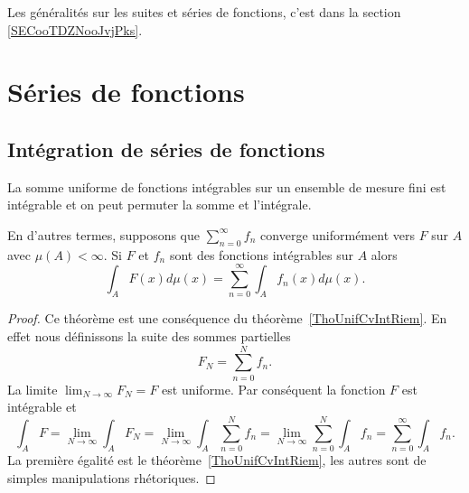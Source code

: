 
Les généralités sur les suites et séries de fonctions, c'est dans la section \ref{SECooTDZNooJvjPks}.

\section{Séries de fonctions}

\subsection{Intégration de séries de fonctions}

\begin{theorem}      \label{ThoCciOlZ}
	La somme uniforme de fonctions intégrables sur un ensemble de mesure fini est intégrable et on peut permuter la somme et l'intégrale.

	En d'autres termes, supposons que \( \sum_{n=0}^{\infty}f_n\) converge uniformément vers \( F\) sur \( A\) avec \( \mu(A)<\infty\). Si \( F\) et \( f_n\) sont des fonctions intégrables sur \( A\) alors
	\begin{equation}
		\int_AF(x)d\mu(x)=\sum_{n=0}^{\infty}\int_Af_n(x)d\mu(x).
	\end{equation}
\end{theorem}

\begin{proof}
	Ce théorème est une conséquence du théorème~\ref{ThoUnifCvIntRiem}. En effet nous définissons la suite des sommes partielles
	\begin{equation}
		F_N=\sum_{n=0}^Nf_n.
	\end{equation}
	La limite \( \lim_{N\to \infty} F_N=F\) est uniforme. Par conséquent la fonction \( F\) est intégrable et
	\begin{equation}
		\int_A F=\lim_{N\to \infty} \int_AF_N=\lim_{N\to \infty} \int_A\sum_{n=0}^Nf_n=\lim_{N\to \infty} \sum_{n=0}^N\int_Af_n=\sum_{n=0}^{\infty}\int_Af_n.
	\end{equation}
	La première égalité est le théorème~\ref{ThoUnifCvIntRiem}, les autres sont de simples manipulations rhétoriques.
\end{proof}

